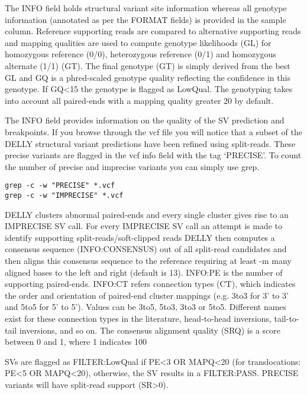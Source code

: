 \begin{note}

The INFO field holds structural variant site information whereas all genotype information (annotated as per the FORMAT fields) is provided in the sample column. Reference supporting reads are compared to alternative supporting reads and mapping qualities are used to compute genotype likelihoods (GL) for homozygous reference (0/0), heterozygous reference (0/1) and homozygous alternate (1/1) (GT). The final genotype (GT) is simply derived from the best GL and GQ is a phred-scaled genotype quality reflecting the confidence in this genotype. If GQ<15 the genotype is flagged as LowQual. The genotyping takes into account all paired-ends with a mapping quality greater 20 by default. 

The INFO field provides information on the quality of the SV prediction and breakpoints. If you browse through the vcf file you will notice that a subset of the DELLY structural variant predictions have been refined using split-reads. These precise variants are flagged in the vcf info field with the tag ‘PRECISE’. To count the number of precise and imprecise variants you can simply use grep.

\end{note}

\begin{steps}
\begin{lstlisting}
grep -c -w "PRECISE" *.vcf
grep -c -w "IMPRECISE" *.vcf
\end{lstlisting}
\end{steps}


\begin{information}
DELLY clusters abnormal paired-ends and every single cluster gives rise to an IMPRECISE SV call. For every IMPRECISE SV call an attempt is made to identify supporting split-reads/soft-clipped reads DELLY then computes a consensus sequence (INFO:CONSENSUS) out of all split-read candidates and then aligns this consensus sequence to the reference requiring at least -m many aligned bases to the left and right (default is 13). INFO:PE is the number of supporting paired-ends. INFO:CT refers connection types (CT), which indicates the order and orientation of paired-end cluster mappings (e.g. 3to3 for 3' to 3' and 5to5 for 5' to 5'). Values can be 3to5, 5to3, 3to3 or 5to5. Different names exist for these connection types in the literature, head-to-head inversions, tail-to-tail inversions, and so on. The consensus alignment quality (SRQ) is a score between 0 and 1, where 1 indicates 100%

SVs are flagged as FILTER:LowQual if PE<3 OR MAPQ<20 (for translocations: PE<5 OR MAPQ<20), otherwise, the SV results in a FILTER:PASS. PRECISE variants will have split-read support (SR>0).

\end{information}

